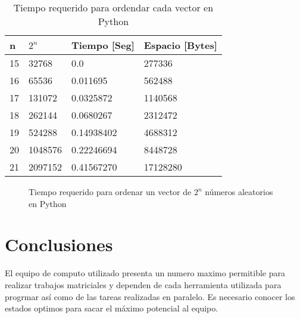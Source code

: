 \documentclass{article}
\begin{document}
\begin{table}[h]
\centering
\begin{tabular}{|l|l|l|l|}
\hline
n  & $2^n$& Tiempo [Seg] & Espacio [Bytes]\\ \hline
15  & 32768                    & 0.0      &  277336                    \\ \hline
16  & 65536                    & 0.011695 & 562488                           \\ \hline
17  & 131072                   & 0.0325872  & 1140568                        \\ \hline
18  & 262144                   & 0.0680267   &  2312472                        \\ \hline
19  & 524288                   & 0.14938402   & 4688312                           \\ \hline
20  & 1048576                  & 0.22246694  & 8448728                           \\ \hline
21  & 2097152                  & 0.41567270  & 17128280                           \\ \hline
\end{tabular}
\caption{Tiempo requerido para ordendar cada vector en Python}
\label{tabla 2}
\end{table}

\begin{figure}
    \centering 
   
    \caption{Tiempo requerido para ordenar un vector de $2^n$ números aleatorios en Python}
    \label{grafica2}

\end{figure}

\section{Conclusiones}
El equipo de computo utilizado presenta un numero maximo permitible para realizar trabajos matriciales y dependen de cada herramienta utilizada para progrmar así como de las tareas realizadas en paralelo. Es necesario conocer los estados optimos para sacar el máximo potencial al equipo.
\end{document}
